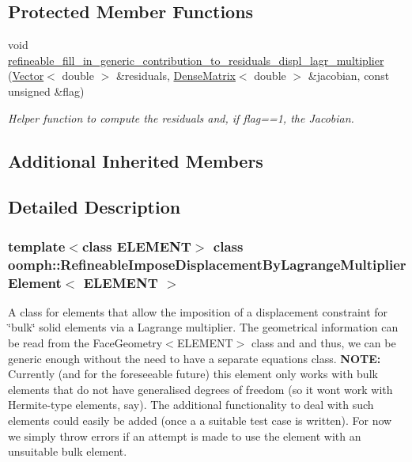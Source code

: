\subsection*{Protected Member Functions}
\begin{DoxyCompactItemize}
\item 
void \hyperlink{classoomph_1_1RefineableImposeDisplacementByLagrangeMultiplierElement_a9957b3fc27b166d31b54ffaaf0e626d2}{refineable\+\_\+fill\+\_\+in\+\_\+generic\+\_\+contribution\+\_\+to\+\_\+residuals\+\_\+displ\+\_\+lagr\+\_\+multiplier} (\hyperlink{classoomph_1_1Vector}{Vector}$<$ double $>$ \&residuals, \hyperlink{classoomph_1_1DenseMatrix}{Dense\+Matrix}$<$ double $>$ \&jacobian, const unsigned \&flag)
\begin{DoxyCompactList}\small\item\em Helper function to compute the residuals and, if flag==1, the Jacobian. \end{DoxyCompactList}\end{DoxyCompactItemize}
\subsection*{Additional Inherited Members}


\subsection{Detailed Description}
\subsubsection*{template$<$class E\+L\+E\+M\+E\+NT$>$\newline
class oomph\+::\+Refineable\+Impose\+Displacement\+By\+Lagrange\+Multiplier\+Element$<$ E\+L\+E\+M\+E\+N\+T $>$}

A class for elements that allow the imposition of a displacement constraint for \char`\"{}bulk\char`\"{} solid elements via a Lagrange multiplier. The geometrical information can be read from the Face\+Geometry$<$\+E\+L\+E\+M\+E\+N\+T$>$ class and and thus, we can be generic enough without the need to have a separate equations class. {\bfseries N\+O\+TE\+:} Currently (and for the foreseeable future) this element only works with bulk elements that do not have generalised degrees of freedom (so it won\textquotesingle{}t work with Hermite-\/type elements, say). The additional functionality to deal with such elements could easily be added (once a a suitable test case is written). For now we simply throw errors if an attempt is made to use the element with an unsuitable bulk element.

